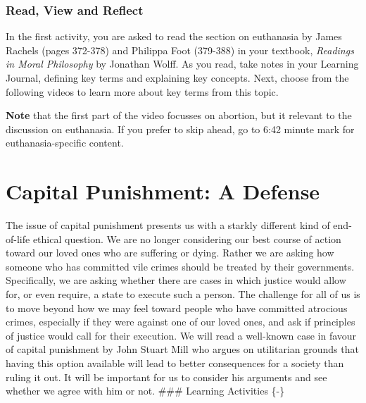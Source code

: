\documentclass[
]{book}
\begin{document}
\begin{reflect}
\hypertarget{read-view-and-reflect-25}{%
\subsubsection*{Read, View and Reflect}\label{read-view-and-reflect-25}}

In the first activity, you are asked to read the section on euthanasia by James Rachels (pages 372-378) and Philippa Foot (379-388) in your textbook, \emph{Readings in Moral Philosophy} by Jonathan Wolff. As you read, take notes in your Learning Journal, defining key terms and explaining key concepts.
Next, choose from the following videos to learn more about key terms from this
topic.
\end{reflect}

\begin{caution}
\textbf{Note} that the first part of the video focusses on abortion, but it relevant to the discussion on euthanasia. If you prefer to skip ahead, go to 6:42 minute mark for euthanasia-specific content.
\end{caution}

\hypertarget{capital-punishment-a-defense}{%
\section*{Capital Punishment: A Defense}\label{capital-punishment-a-defense}}

The issue of capital punishment presents us with a starkly different kind of end-of-life ethical question. We are no longer considering our best course of action toward our loved ones who are suffering or dying. Rather we are asking how someone who has committed vile crimes should be treated by their governments.
Specifically, we are asking whether there are cases in which justice would allow for, or even require, a state to execute such a person. The challenge for all of us is to move beyond how we may feel toward people who have committed atrocious crimes, especially if they were against one of our loved ones, and ask if principles of justice would call for their execution.
We will read a well-known case in favour of capital punishment by John Stuart Mill who argues on utilitarian grounds that having this option available will lead to better consequences for a society than ruling it out. It will be important for us to consider his arguments and see whether we agree with him or not.
\#\#\# Learning Activities \{-\}
\end{document}
